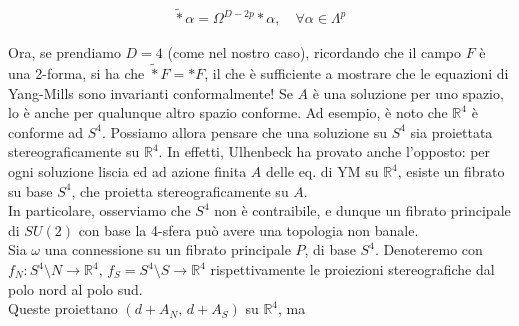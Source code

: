 \documentclass{report}
\begin{document}
\begin{align}
    \tilde{*} \alpha = \Omega^{D-2p} *\alpha, \quad \forall \alpha \in \Lambda^p
\end{align}

Ora, se prendiamo \(D = 4\) (come nel nostro caso), ricordando che il campo \(F\) è una 2-forma, si ha che \(\tilde{*} F = *F\), il che è sufficiente a mostrare che le equazioni di Yang-Mills sono invarianti conformalmente! Se \(A\) è una soluzione per uno spazio, lo è anche per qualunque altro spazio conforme. Ad esempio, è noto che \(\mathbb{R}^4\) è conforme ad \(S^4\). Possiamo allora pensare che una soluzione su \(S^4\) sia proiettata stereograficamente su \(\mathbb{R}^4\). In effetti, Ulhenbeck ha provato anche l'opposto: per ogni soluzione liscia ed ad azione finita \(A\) delle eq. di YM su \(\mathbb{R}^4\), esiste un fibrato su base \(S^4\), che proietta stereograficamente su \(A\). \\


In particolare, osserviamo che \(S^4\) non è contraibile, e dunque un fibrato principale di \(SU(2)\) con base la 4-sfera può avere una topologia non banale. \\


Sia \(\omega\) una connessione su un fibrato principale \(P\), di base \(S^4\). Denoteremo con \(f_N: S^4 \setminus N \rightarrow \mathbb{R}^4, \, f_S = S^4 \setminus S \rightarrow \mathbb{R}^4\) rispettivamente le proiezioni stereografiche dal polo nord al polo sud. \\ 

Queste proiettano \((d+A_N, \, d+A_S)\) su \(\mathbb{R}^4 \), ma 
\end{document}
